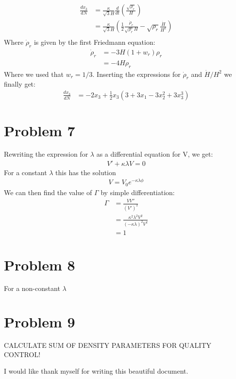 \documentclass[reprint,english,notitlepage]{revtex4-1}  %
\begin{document}
\begin{align}
	\frac{dx_3}{dN} &= \frac{\kappa}{\sqrt{3}H}\frac{d}{dt}\left(\frac{\sqrt{\rho_r}}{H}\right)\\
									&= \frac{\kappa}{\sqrt{3}H}\left(\frac{1}{2}\frac{\dot{\rho}_r}
									{\sqrt{\rho_r}H} - \sqrt{\rho_r}\frac{\dot{H}}{H^2}\right)\\
\end{align}
Where $\dot{\rho}_r$ is given by the first Friedmann equation:
\begin{align}
	\dot{\rho}_r &= -3 H (1 + w_r)\rho_r \\
							 &= -4 H\rho_r
\end{align}
Where we used that $w_r=1/3$. Inserting the expressions for $\dot{\rho}_r$ and
$\dot{H}/H^2$ we finally get:
\begin{align}
	\frac{dx_3}{dN} &=-2x_3 + \frac{1}{2}x_3\left(3+3x_1 - 3x_2^2 + 3x_3^3\right)
\end{align}

\section{Problem 7}
Rewriting the expression for $\lambda$ as a differential equation for V, we get:
\begin{align}
	V' + \kappa \lambda V = 0
\end{align}
For a constant $\lambda$ this has the solution
\begin{align}
	V = V_0 e^{-\kappa\lambda\phi}
\end{align}
We can then find the value of $\Gamma$ by simple differentiation:
\begin{align}
	\Gamma &= \frac{V V''}{(V')^2} \\
				 &= \frac{\kappa^2\lambda^2 V^2}{(-\kappa\lambda)^2 V^2} \\
				 &= 1
\end{align}
\section{Problem 8}
For a non-constant $\lambda$
\section{Problem 9}
CALCULATE SUM OF DENSITY PARAMETERS FOR QUALITY CONTROL!

\begin{acknowledgments}  %
I would like thank myself for writing this beautiful document.
\end{acknowledgments}
\end{document}

